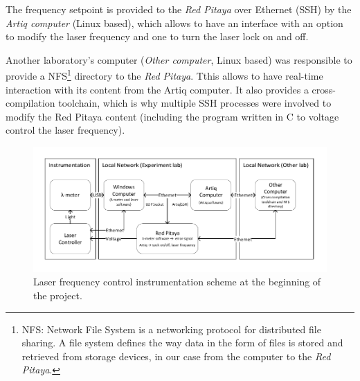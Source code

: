 \documentclass[a4paper,12pt]{article}
\begin{document}
The frequency setpoint is provided to the \textit{Red Pitaya} over Ethernet (SSH) by the \textit{Artiq computer} (Linux based), which allows to have an interface with an option to modify the laser frequency and one to turn the laser lock on and off.

Another laboratory's computer (\textit{Other computer}, Linux based) was responsible to provide a NFS\footnote{NFS: Network File System is a networking protocol for distributed file sharing. A file system defines the way data in the form of files is stored and retrieved from storage devices, in our case from the computer to the \textit{Red Pitaya}.} directory to the \textit{Red Pitaya}. Tthis allows to have real-time interaction with its content from the Artiq computer. It also provides a cross-compilation toolchain, which is why multiple SSH processes were involved to modify the Red Pitaya content (including the program written in C to voltage control the laser frequency).

\begin{figure}[!h]
    \centering
    \includegraphics[width=\textwidth]{Images/schematic_before.pdf}
    \captionsetup{justification=centering}
    \caption{Laser frequency control instrumentation scheme at the beginning of the project.} %
    \label{fig:schematic}
\end{figure}
\end{document}
